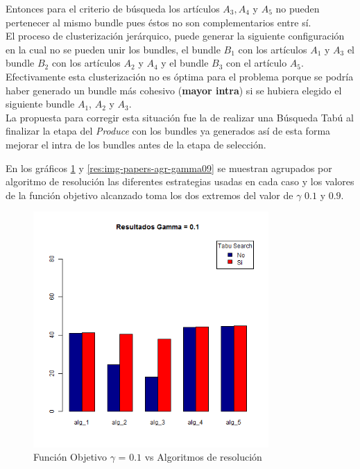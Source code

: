 Entonces para el criterio de búsqueda los artículos $A_3, A_4$ y $A_5$ no pueden pertenecer al mismo bundle pues éstos no son complementarios entre sí.\\
El proceso de clusterización jerárquico, puede generar la siguiente configuración en la cual no se pueden unir los bundles, el bundle $B_1$ con los artículos $A_1$ y $A_3$ el bundle $B_2$ con los artículos $A_2$ y $A_4$ y el bundle $B_3$ con el artículo $A_5$. Efectivamente esta clusterización no es óptima para el problema porque se podría haber generado un bundle más cohesivo (\textbf{mayor intra}) si se hubiera elegido el siguiente bundle $A_1$, $A_2$ y $A_3$.\\
La propuesta para corregir esta situación fue la de realizar una Búsqueda Tabú al finalizar la etapa del \textit{Produce} con los bundles ya generados así de esta forma mejorar el intra de los bundles antes de la etapa de selección.

\newpage

En los gráficos \ref{res:img-papers-agr-gamma01} y \ref{res:img-papers-agr-gamma09} se muestran agrupados por algoritmo de resolución las diferentes estrategias usadas en cada caso y los valores de la función objetivo alcanzado toma los dos extremos del valor de $\gamma$ $0.1$ y $0.9$. 

\begin{figure}[H]
  \centering
    \includegraphics[width=0.8\textwidth]{resultados/papers/Graficos_agrupados/gamma01.png}
  \caption{Función Objetivo $\gamma$ = $0.1$ vs Algoritmos de resolución}
  \label{res:img-papers-agr-gamma01}
\end{figure}

